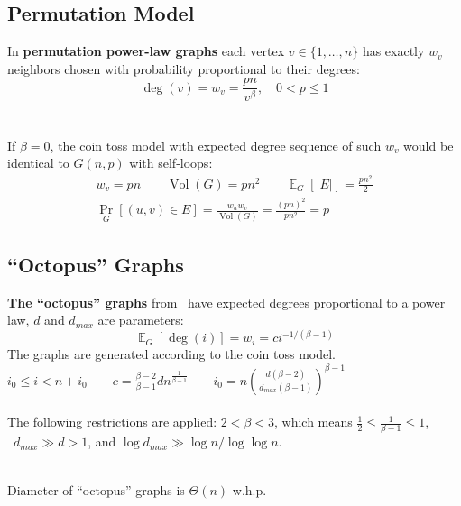 \documentclass{beamer}
\newcommand{\E}{\mathop{{}\mathbb{E}}}
\DeclareMathOperator*{\Vol}{Vol}
\newcommand{\autotitle}{\secname\ifdefempty{\subsecname}{}{~--- \subsecname}}
\begin{document}
\subsection{Permutation Model}

\begin{frame}{\autotitle}
    In \textbf{permutation power-law graphs} each vertex
    $v\in\{1,\ldots,n\}$ has exactly $w_v$ neighbors chosen
    with probability proportional to their degrees:
    \begin{equation*}
        \deg(v)=w_v=\frac{pn}{v^\beta},\quad 0<p\leq 1
    \end{equation*}\\~\\
    If $\beta=0$, the coin toss model with expected degree sequence
    of such $w_v$ would be identical to $G(n,p)$ with self-loops:
    \begin{gather*}
        w_v=pn
        \qquad \Vol(G)=pn^2
        \qquad \E_G[|E|]=\frac{p n^2}{2}\\
        \Pr_G[(u,v)\in E]=\frac{w_u w_v}{\Vol(G)}=\frac{(pn)^2}{pn^2}=p
    \end{gather*}
\end{frame}

\subsection{\texorpdfstring{``Octopus''}{"Octopus"} Graphs}

\begin{frame}{\autotitle}
    \textbf{The ``octopus'' graphs} from~\cite{cl04} have expected degrees
    proportional to a power law, $d$ and $d_{max}$ are parameters:
    \begin{equation*}
        \E_G[\deg(i)]=w_i=ci^{-1/(\beta-1)}
    \end{equation*}
    The graphs are generated according to the coin toss model.
    $i_0\leq i<n+i_0
    \qquad c=\frac{\beta-2}{\beta-1}dn^{\frac{1}{\beta-1}}
    \qquad i_0=n\left(\frac{d(\beta-2)}{d_{max}(\beta-1)}\right)^{\beta-1}$\\~\\
    The following restrictions are applied:
    $2<\beta<3$, which means $\frac{1}{2}\leq\frac{1}{\beta-1}\leq 1$,
    $\enspace d_{max}\gg d>1$, and $\log d_{max}\gg \log n/\log\log n$.\\~\\

    \begin{theorem}[\cite{cl04}]
        Diameter of ``octopus'' graphs is $\Theta(n)$ w.h.p.
    \end{theorem}
\end{frame}
\end{document}
